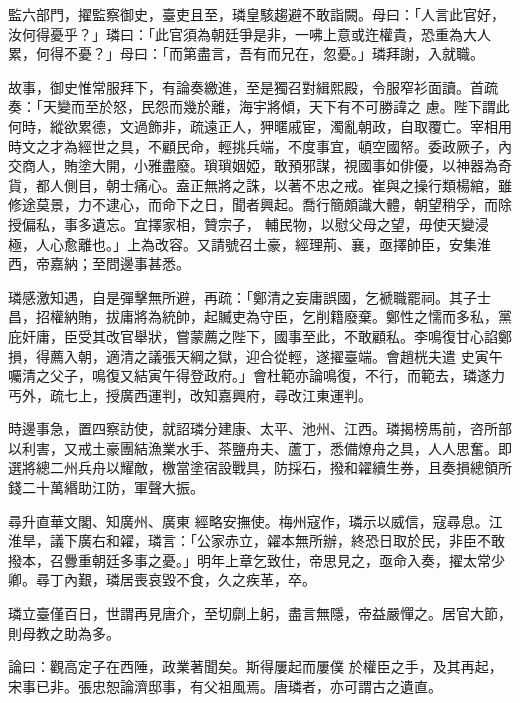 \begin{pinyinscope}
 監六部門，擢監察御史，臺吏且至，璘皇駭趨避不敢詣闕。母曰：「人言此官好，汝何得憂乎？」璘曰：「此官須為朝廷爭是非，一咈上意或迕權貴，恐重為大人累，何得不憂？」母曰：「而第盡言，吾有而兄在，忽憂。」璘拜謝，入就職。



 故事，御史惟常服拜下，有論奏繳進，至是獨召對緝熙殿，令服窄衫面讀。首疏奏：「天變而至於怒，民怨而幾於離，海宇將傾，天下有不可勝諱之
 慮。陛下謂此何時，縱欲累德，文過飾非，疏遠正人，狎暱戚宦，濁亂朝政，自取覆亡。宰相用時文之才為經世之具，不顧民命，輕挑兵端，不度事宜，頓空國帑。委政厥子，內交商人，賄塗大開，小雅盡廢。瑣瑣姻婭，敢預邪謀，視國事如俳優，以神器為奇貨，都人側目，朝士痛心。盍正無將之誅，以著不忠之戒。崔與之操行類楊綰，雖修途莫景，力不逮心，而命下之日，聞者興起。喬行簡頗識大體，朝望稍孚，而除授偏私，事多遺忘。宜擇家相，贊宗子，
 輔民物，以慰父母之望，毋使天變浸極，人心愈離也。」上為改容。又請號召土豪，經理荊、襄，亟擇帥臣，安集淮西，帝嘉納；至問邊事甚悉。



 璘感激知遇，自是彈擊無所避，再疏：「鄭清之妄庸誤國，乞褫職罷祠。其子士昌，招權納賄，拔庸將為統帥，起贓吏為守臣，乞削籍廢棄。鄭性之懦而多私，黨庇奸庸，臣受其改官舉狀，嘗蒙薦之陛下，國事至此，不敢顧私。李鳴復甘心諂鄭損，得薦入朝，適清之議張天綱之獄，迎合從輕，遂擢臺端。會趙桄夫遣
 史寅午囑清之父子，鳴復又結寅午得登政府。」會杜範亦論鳴復，不行，而範去，璘遂力丐外，疏七上，授廣西運判，改知嘉興府，尋改江東運判。



 時邊事急，置四察訪使，就詔璘分建康、太平、池州、江西。璘揭榜馬前，咨所部以利害，又戒土豪團結漁業水手、茶鹽舟夫、蘆丁，悉備燎舟之具，人人思奮。即選將總二州兵舟以耀敵，檄當塗宿設戰具，防採石，撥和糴續生券，且奏損總領所錢二十萬緡助江防，軍聲大振。



 尋升直華文閣、知廣州、廣東
 經略安撫使。梅州寇作，璘示以威信，寇尋息。江淮旱，議下廣右和糴，璘言：「公家赤立，糴本無所辦，終恐日取於民，非臣不敢撥本，召釁重朝廷多事之憂。」明年上章乞致仕，帝思見之，亟命入奏，擢太常少卿。尋丁內艱，璘居喪哀毀不食，久之疾革，卒。



 璘立臺僅百日，世謂再見唐介，至切劘上躬，盡言無隱，帝益嚴憚之。居官大節，則母教之助為多。



 論曰：觀高定子在西陲，政業著聞矣。斯得屢起而屢僕
 於權臣之手，及其再起，宋事已非。張忠恕論濟邸事，有父祖風焉。唐璘者，亦可謂古之遺直。



\end{pinyinscope}